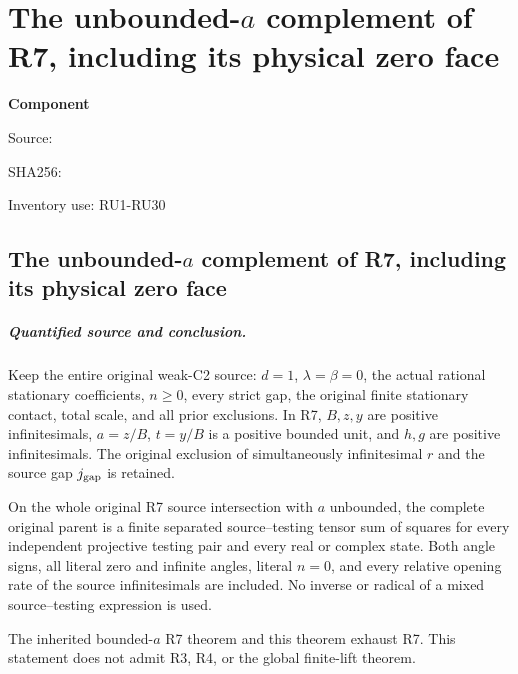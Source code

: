 \chapter{The unbounded-$a$ complement of R7, including its physical zero face}
\label{component:p405d96527133}
\noindent\textbf{Component }\par
{\small\noindent Source: \par}
{\small\noindent SHA256: \par}
{\small\noindent Inventory use: RU1-RU30\par}
\medskip
\section{The unbounded-$a$ complement of R7, including its physical zero face}
\label{p405d96527133:sec:r7-unbounded-a}

\paragraph{Quantified source and conclusion.}
Keep the entire original weak-C2 source: $d=1$, $\lambda=\beta=0$,
the actual rational stationary coefficients, $n\ge0$, every strict gap,
the original finite stationary contact, total scale, and all prior
exclusions. In R7, $B,z,y$ are positive infinitesimals,
$a=z/B$, $t=y/B$ is a positive bounded unit, and $h,g$ are positive
infinitesimals. The original exclusion of simultaneously infinitesimal
$r$ and the source gap $j_{\rm gap}$ is retained.

\begin{theorem}
On the whole original R7 source intersection with $a$ unbounded,
the complete original parent is a finite separated source--testing
tensor sum of squares for every independent projective testing pair
and every real or complex state. Both angle signs, all literal zero
and infinite angles, literal $n=0$, and every relative opening rate
of the source infinitesimals are included. No inverse or radical of
a mixed source--testing expression is used.
\end{theorem}

The inherited bounded-$a$ R7 theorem and this theorem exhaust R7.
This statement does not admit R3, R4, or the global finite-lift theorem.


